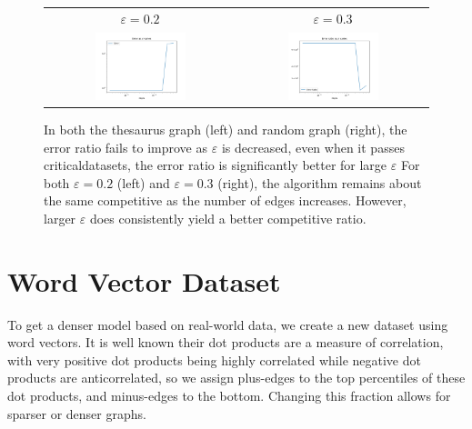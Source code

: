 \documentclass[
]{article}
\begin{document}
\begin{figure}[!htb]
  \begin{tabular}{cc}
    {\(\varepsilon  = 0.2\)} & {\(\varepsilon = 0.3\)}                                 \\
    \includegraphics[width=0.5\textwidth]{images/error_ratio_as_eps_varies_loglog_thesaurus.png}
                             &
    \includegraphics[width=0.5\textwidth]{images/error_ratio_as_eps_varies_loglog.png} \\
  \end{tabular}
  \caption{\label{fig:error-ratio-small-eps}
    In both the thesaurus graph (left) and random graph (right), the error
    ratio fails to improve as $\varepsilon$ is decreased, even when it passes
    criticaldatasets, the error ratio is significantly better for large $\varepsilon$
    For both $\varepsilon = 0.2$ (left) and $\varepsilon = 0.3$ (right), the
    algorithm remains about the same competitive as the number of edges
    increases. However, larger $\varepsilon$ does consistently yield
    a better competitive ratio.}
\end{figure}

\hypertarget{word-vector-dataset}{%
  \section{Word Vector Dataset}\label{word-vector-dataset}}


To get a denser model based on real-world data, we create a new dataset
using word vectors. It is well known their dot products are a measure of
correlation, with very positive dot products being highly correlated
while negative dot products are anticorrelated, so we assign plus-edges
to the top percentiles of these dot products, and minus-edges to the
bottom. Changing this fraction allows for sparser or denser graphs.
\end{document}
